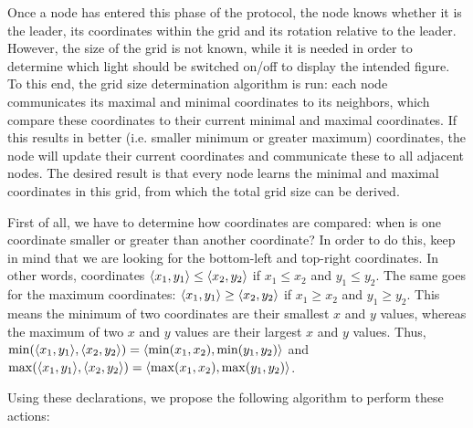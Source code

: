 Once a node has entered this phase of the protocol, the node knows whether it is the leader, its coordinates within the grid and its rotation relative to the leader. However, the size of the grid is not known, while it is needed in order to determine which light should be switched on/off to display the intended figure. To this end, the grid size determination algorithm is run: each node communicates its maximal and minimal coordinates to its neighbors, which compare these coordinates to their current minimal and maximal coordinates. If this results in better (i.e. smaller minimum or greater maximum) coordinates, the node will update their current coordinates and communicate these to all adjacent nodes. The desired result is that every node learns the minimal and maximal coordinates in this grid, from which the total grid size can be derived.

First of all, we have to determine how coordinates are compared: when is one coordinate smaller or greater than another coordinate? In order to do this, keep in mind that we are looking for the bottom-left and top-right coordinates. In other words, coordinates $\langle x_1, y_1 \rangle \leq \langle x_2, y_2 \rangle$ if $x_1 \leq x_2$ and $y_1 \leq y_2$. The same goes for the maximum coordinates: $\langle x_1, y_1 \rangle \geq \langle x_2, y_2 \rangle$ if $x_1 \geq x_2$ and $y_1 \geq y_2$. This means the minimum of two coordinates are their smallest $x$ and $y$ values, whereas the maximum of two $x$ and $y$ values are their largest $x$ and $y$ values. Thus, $\operatorname{min}(\langle x_1, y_1 \rangle, \langle x_2, y_2 \rangle) = \langle \operatorname{min}(x_1,x_2), \operatorname{min}(y_1,y_2) \rangle$ and $\operatorname{max}(\langle x_1, y_1 \rangle, \langle x_2, y_2 \rangle) = \langle \operatorname{max}(x_1,x_2), \operatorname{max}(y_1,y_2) \rangle$.

Using these declarations, we propose the following algorithm to perform these actions:

